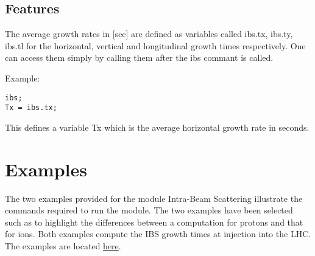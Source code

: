 \subsection{Features}
The average growth rates in [sec] are defined as variables called
ibs.tx, ibs.ty, ibs.tl for the horizontal, vertical and longitudinal
growth times respectively. One can access them simply by calling them
after the ibs commant is called.   

 Example: 
\begin{verbatim} 
ibs; 
Tx = ibs.tx; 
\end{verbatim}
   
This defines a variable Tx which is the average horizontal growth rate in seconds. 

\section{Examples}
The two examples provided for the module Intra-Beam Scattering
illustrate the commands required to run the module. The two examples
have been selected such as to highlight the differences between a
computation for protons and that for ions. Both examples compute the IBS
growth times at injection into the LHC. The examples are located
\href{http://madx.web.cern.ch/madx/madX/examples/ibs/}{here}.

